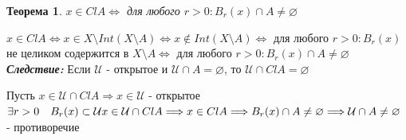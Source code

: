 \documentclass[12pt,letterpaper]{report}
\makeatletter
\newtheorem*{theorem-non}{Теорема}
\theoremstyle{definition}
\newcommand{\follow}{\textbf{\textit{Следствие:}}}
\renewenvironment{proof}[1][\proofname]{%
   \par\pushQED{\qed}\normalfont%
   \topsep6\p@\@plus6\p@\relax
   \trivlist\item[\hskip\labelsep\bfseries#1\@addpunct{.}]%
   \ignorespaces
}{%
   \popQED\endtrivlist\@endpefalse
}
\makeatother
\begin{document}
\begin{theorem-non}
    $x \in Cl A \Longleftrightarrow$ для любого $r > 0: B_r(x) \cap A \neq \varnothing$
\end{theorem-non}
\begin{proof}
    $x \in Cl A \Longleftrightarrow x \in X \setminus Int(X \setminus A) \Longleftrightarrow
    x \notin Int(X \setminus A) \Longleftrightarrow$ для любого $r > 0: B_r(x)$ не целиком содержится 
    в $X \setminus A \Longleftrightarrow$ для любого $r > 0: B_r(x) \cap A \neq \varnothing$ 
\end{proof}
\follow 
\quad Если $\mathcal{U}$ - открытое и $\mathcal{U} \cap A = \varnothing$, то $\mathcal{U} \cap Cl A = \varnothing$
\begin{proof}
    Пусть $x \in \mathcal{U} \cap Cl A \Longrightarrow x \in \mathcal{U}$ - открытое $\exists r > 0 \quad B_r(x) \subset \mathcal{U}\\
    x \in \mathcal{U} \cap Cl A \Longrightarrow x \in Cl A \Longrightarrow B_r(x) \cap A \neq \varnothing \Longrightarrow \mathcal{U} \cap A \neq \varnothing$ - противоречие
\end{proof}
\end{document}
